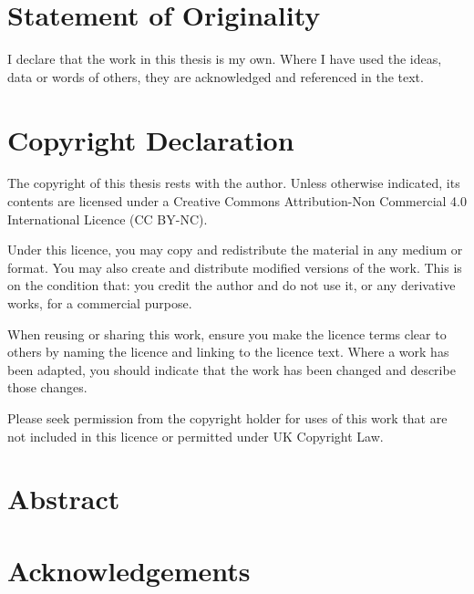 \documentclass[12pt,oneside,a4paper]{report}
\begin{document}

\setcounter{page}{2}%

\chapter*{Statement of Originality}
I declare that the work in this thesis is my own. Where I have used the ideas, data or words of
others, they are acknowledged and referenced in the text.
\clearpage
\chapter*{Copyright Declaration}
The copyright of this thesis rests with the author. Unless otherwise indicated, its contents
are licensed under a Creative Commons Attribution-Non Commercial 4.0 International Licence
(CC BY-NC).

Under this licence, you may copy and redistribute the material in any medium or format. You may
also create and distribute modified versions of the work. This is on the condition that: you
credit the author and do not use it, or any derivative works, for a commercial purpose.

When reusing or sharing this work, ensure you make the licence terms clear to others by naming
the licence and linking to the licence text. Where a work has been adapted, you should indicate
that the work has been changed and describe those changes.

Please seek permission from the copyright holder for uses of this work that are not included in
this licence or permitted under UK Copyright Law.
\clearpage
\chapter*{Abstract}

\clearpage
\tableofcontents
\listoftables
\listoffigures
\clearpage
\chapter*{Acknowledgements}

\clearpage







\appendix




\end{document}
